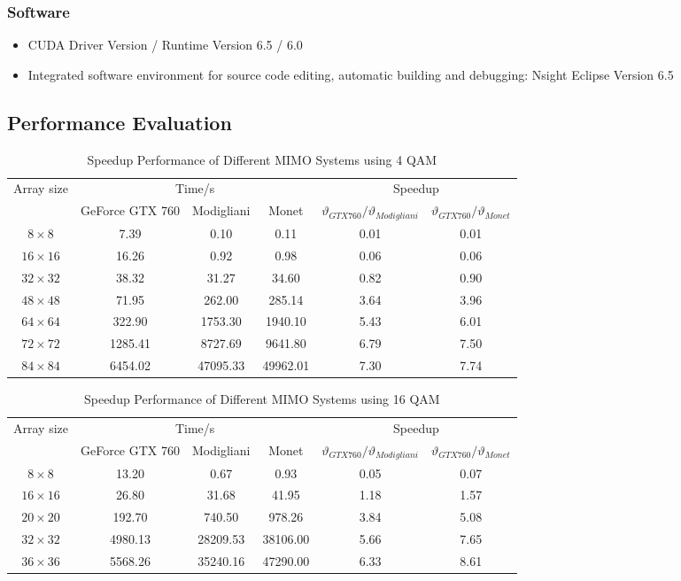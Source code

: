 \documentclass[letterpaper, 10pt, conference]{ieeeconf}
\begin{document}
\subsubsection{Software}
\begin{itemize}
\item CUDA Driver Version / Runtime Version      6.5 / 6.0
\item Integrated software environment for source code editing, automatic building and debugging: Nsight Eclipse Version 6.5
\end{itemize}
\subsection{Performance Evaluation}
\begin{table*}[htb]
\centering
\caption{ Speedup Performance of Different MIMO Systems using 4 QAM}
\begin{tabular}{|c|c|c|c|c|c|}
\hline
\multirow{2}{*}{ Array size} & \multicolumn{3}{|c|}{Time/s} & \multicolumn{2}{|c|}{Speedup}\\
\cline{2-6}
&GeForce GTX 760 & Modigliani & Monet &  $\vartheta_{GTX 760}/\vartheta_{Modigliani}$  & $\vartheta_{GTX 760}/\vartheta_{Monet}$ \\
\hline
$8\times 8$& 7.39& 0.10&0.11 & 0.01& 0.01\\
\hline
$16\times 16$&16.26 & 0.92&0.98& 0.06& 0.06\\
\hline
$32\times 32$&38.32 & 31.27& 34.60& 0.82& 0.90\\
\hline
$48\times 48$&71.95& 262.00& 285.14& 3.64& 3.96\\
\hline
$64\times 64$& 322.90&1753.30&1940.10&5.43& 6.01 \\
\hline
$72\times 72 $&1285.41&8727.69 &9641.80 &6.79 &7.50 \\
\hline
$84\times 84$ &6454.02&47095.33&49962.01&7.30&7.74\\
\hline
\end{tabular}
\label{speedup1}
\end{table*}
\begin{table*}[htb]
\centering
\caption{ Speedup Performance of Different MIMO Systems using 16 QAM}
\begin{tabular}{|c|c|c|c|c|c|}
\hline
\multirow{2}{*}{ Array size} & \multicolumn{3}{|c|}{Time/s} & \multicolumn{2}{|c|}{Speedup}\\
\cline{2-6}
&GeForce GTX 760 & Modigliani & Monet &  $\vartheta_{GTX 760}/\vartheta_{Modigliani}$  &  $\vartheta_{GTX 760}/\vartheta_{Monet}$ \\
\hline
$8\times 8$&13.20& 0.67&0.93 & 0.05&0.07\\
\hline
$16\times 16$&26.80 & 31.68&41.95& 1.18& 1.57\\
\hline
$20\times 20$&192.70 & 740.50& 978.26& 3.84& 5.08\\
\hline
$32\times 32$&4980.13& 28209.53& 38106.00& 5.66& 7.65\\
\hline
$36\times 36$& 5568.26&35240.16&47290.00&6.33& 8.61 \\
\hline
\end{tabular}
\label{speedup2}
\end{table*}
\end{document}
